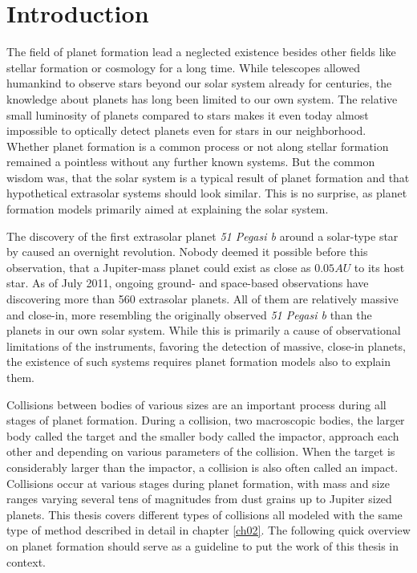 \cleardoublepage
\chapter{Introduction}
\label{ch01}
The field of planet formation lead a neglected existence besides other fields like stellar formation or cosmology for a long time. While telescopes allowed humankind to observe stars beyond our solar system already for centuries, the knowledge about planets has long been limited to our own system. The relative small luminosity of planets compared to stars makes it even today almost impossible to optically detect planets even for stars in our neighborhood. Whether planet formation is a common process or not along stellar formation remained a pointless without any further known systems. But the common wisdom was, that the solar system is a typical result of planet formation and that hypothetical extrasolar systems should look similar. This is no surprise, as planet formation models primarily aimed at explaining the solar system.

The discovery of the first extrasolar planet \emph{51 Pegasi b} around a solar-type star by \cite{1995Natur.378..355M} caused an overnight revolution. Nobody deemed it possible before this observation, that a Jupiter-mass planet could exist as close as $0.05 AU$ to its host star. As of July 2011, ongoing ground- and space-based observations have discovering more than 560 extrasolar planets. All of them are relatively massive and close-in, more resembling the originally observed \emph{51 Pegasi b} than the planets in our own solar system. While this is primarily a cause of observational limitations of the instruments, favoring the detection of massive, close-in planets, the existence of such systems requires planet formation models also to explain them.

Collisions between bodies of various sizes are an important process during all stages of planet formation. During a collision, two macroscopic bodies, the larger body called the target and the smaller body called the impactor, approach each other and depending on various parameters of the collision. When the target is considerably larger than the impactor, a collision is also often called an impact. Collisions occur at various stages during planet formation, with mass and size ranges varying several tens of magnitudes from dust grains up to Jupiter sized planets. This thesis covers different types of collisions all modeled with the same type of method described in detail in chapter \ref{ch02}. The following quick overview on planet formation should serve as a guideline to put the work of this thesis in context.

